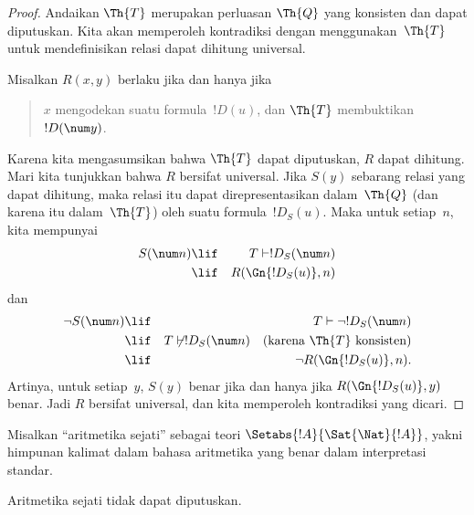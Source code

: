 \documentclass[../../../include/open-logic-section]{subfiles}
\begin{document}
\begin{proof}
Andaikan $\Th{T}$ merupakan perluasan $\Th{Q}$ yang konsisten dan dapat
diputuskan. Kita akan memperoleh kontradiksi dengan menggunakan~$\Th{T}$
untuk mendefinisikan relasi dapat dihitung universal.

Misalkan $R(x,y)$ berlaku jika dan hanya jika
\begin{quote}
$x$ mengodekan suatu formula~$!D(u)$, dan $\Th{T}$ membuktikan
$!D(\num y)$.
\end{quote}
Karena kita mengasumsikan bahwa $\Th{T}$ dapat diputuskan, $R$ dapat dihitung.
Mari kita tunjukkan bahwa $R$ bersifat universal. Jika $S(y)$ sebarang relasi yang
dapat dihitung, maka relasi itu dapat direpresentasikan dalam~$\Th{Q}$ (dan
karena itu dalam~$\Th{T}$) oleh suatu formula~$!D_S(u)$. Maka untuk setiap~$n$,
kita mempunyai
\begin{eqnarray*}
S(\num n) & \lif & T \vdash !D_S(\num n) \\
& \lif & R(\Gn{!D_S(u)}, n)
\end{eqnarray*}
dan
\begin{eqnarray*}
\lnot S(\num n) & \lif & T \vdash \lnot !D_S(\num n) \\
& \lif & T \not\vdash !D_S(\num n) \quad \text{(karena $\Th{T}$
  konsisten)} \\
& \lif & \lnot R(\Gn{!D_S(u)}, n).
\end{eqnarray*}
Artinya, untuk setiap~$y$, $S(y)$ benar jika dan hanya jika
$R(\Gn{!D_S(u)}, y)$ benar. Jadi $R$ bersifat universal, dan kita memperoleh
kontradiksi yang dicari.
\end{proof}

Misalkan ``aritmetika sejati'' sebagai teori $\Setabs{!A}{ \Sat{\Nat}{!A}}$,
yakni himpunan kalimat dalam bahasa aritmetika yang benar dalam interpretasi
standar.

\begin{cor}
Aritmetika sejati tidak dapat diputuskan.
\end{cor}

\end{document}
